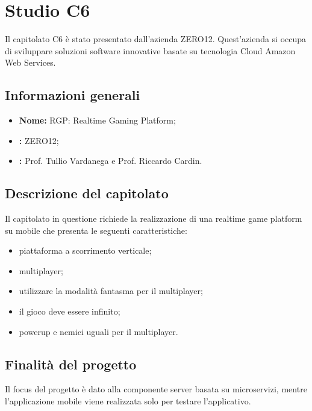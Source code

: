 \section{Studio C6}
Il capitolato C6 è stato presentato dall'azienda ZERO12. Quest'azienda si occupa di sviluppare soluzioni software
innovative basate su tecnologia Cloud Amazon Web Services.

\subsection{Informazioni generali}
\begin{itemize}
	\item \textbf{Nome:} RGP: Realtime Gaming Platform;
	\item \textbf{:} ZERO12;
	\item \textbf{:} Prof. Tullio Vardanega e Prof. Riccardo Cardin.
\end{itemize}

\subsection{Descrizione del capitolato}
Il capitolato in questione richiede la realizzazione di una realtime game platform su mobile che presenta le seguenti caratteristiche:
\begin{itemize}
	\item piattaforma a scorrimento verticale;
	\item multiplayer;
	\item utilizzare la modalità fantasma per il multiplayer;
	\item il gioco deve essere infinito;
	\item powerup e nemici uguali per il multiplayer.
\end{itemize}


\subsection{Finalità del progetto}
Il focus del progetto è dato alla componente server basata su microservizi, mentre l'applicazione mobile viene realizzata solo per testare l'applicativo.

